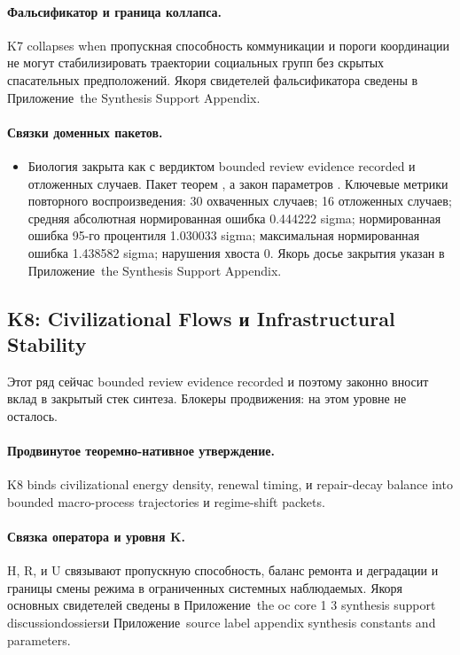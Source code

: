 \paragraph{Фальсификатор и граница коллапса.}
K7 collapses when пропускная способность коммуникации и пороги координации не могут стабилизировать траектории социальных групп без скрытых спасательных предположений.
Якоря свидетелей фальсификатора сведены в Приложение~the Synthesis Support Appendix.

\paragraph{Связки доменных пакетов.}
\begin{itemize}[leftmargin=1.6em,nosep]
\item Биология закрыта как  с вердиктом bounded review evidence recorded и  отложенных случаев. Пакет теорем , а закон параметров . Ключевые метрики повторного воспроизведения: 30 охваченных случаев; 16 отложенных случаев; средняя абсолютная нормированная ошибка 0.444222 sigma; нормированная ошибка 95-го процентиля 1.030033 sigma; максимальная нормированная ошибка 1.438582 sigma; нарушения хвоста 0. Якорь досье закрытия указан в Приложение~the Synthesis Support Appendix.
\end{itemize}

\subsection{K8: Civilizational Flows и Infrastructural Stability}
\label{sec:oc-core-1-3-synthesis-k8}
Этот ряд сейчас bounded review evidence recorded и поэтому законно вносит вклад в закрытый стек синтеза.
Блокеры продвижения: на этом уровне не осталось.

\paragraph{Продвинутое теоремно-нативное утверждение.}
K8 binds civilizational energy density, renewal timing, и repair-decay balance into bounded macro-process trajectories и regime-shift packets.

\paragraph{Связка оператора и уровня K.}
H, R, и U связывают пропускную способность, баланс ремонта и деградации и границы смены режима в ограниченных системных наблюдаемых.
Якоря основных свидетелей сведены в Приложение~the oc core 1 3 synthesis support discussiondossiersи Приложение~source label appendix synthesis constants and parameters.

